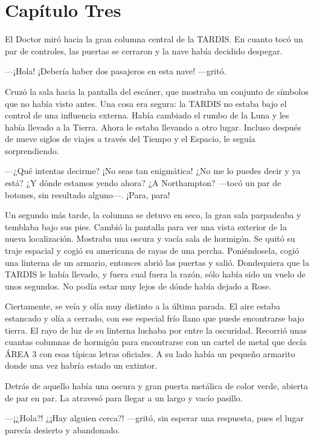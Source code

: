 \chapter*{Capítulo Tres}

El Doctor miró hacia la gran columna central de la TARDIS. En cuanto
tocó un par de controles, las puertas se cerraron y la nave había
decidido despegar.

---¡Hola! ¡Debería haber dos pasajeros en esta nave! ---gritó.

Cruzó la sala hacia la pantalla del escáner, que mostraba un conjunto de
símbolos que no había visto antes. Una cosa era segura: la TARDIS no
estaba bajo el control de una influencia externa. Había cambiado el
rumbo de la Luna y les había llevado a la Tierra. Ahora le estaba
llevando a otro lugar. Incluso después de nueve siglos de viajes a
través del Tiempo y el Espacio, le seguía sorprendiendo.

---¿Qué intentas decirme? ¡No seas tan enigmática! ¿No me lo puedes
decir y ya está? ¿Y dónde estamos yendo ahora? ¿A Northampton? ---tocó
un par de botones, sin resultado alguno---. ¡Para, para!

Un segundo más tarde, la columna se detuvo en seco, la gran sala
parpadeaba y temblaba bajo sus pies. Cambió la pantalla para ver una
vista exterior de la nueva localización. Mostraba una oscura y vacía
sala de hormigón. Se quitó su traje espacial y cogió su americana de
rayas de una percha. Poniéndosela, cogió una linterna de un armario,
entonces abrió las puertas y salió. Dondequiera que la TARDIS le había
llevado, y fuera cual fuera la razón, sólo había sido un vuelo de unos
segundos. No podía estar muy lejos de dónde había dejado a Rose.

Ciertamente, se veía y olía muy distinto a la última parada. El aire
estaba estancado y olía a cerrado, con ese especial frío llano que puede
encontrarse bajo tierra. El rayo de luz de su linterna luchaba por entre
la oscuridad. Recorrió unas cuantas columnas de hormigón para
encontrarse con un cartel de metal que decía ÁREA 3 con esas típicas
letras oficiales. A su lado había un pequeño armarito donde una vez
habría estado un extintor.

Detrás de aquello había una oscura y gran puerta metálica de color
verde, abierta de par en par. La atravesó para llegar a un largo y vacío
pasillo.

---¡¿Hola?! ¿¡Hay alguien cerca?! ---gritó, sin esperar una respuesta,
pues el lugar parecía desierto y abandonado.


